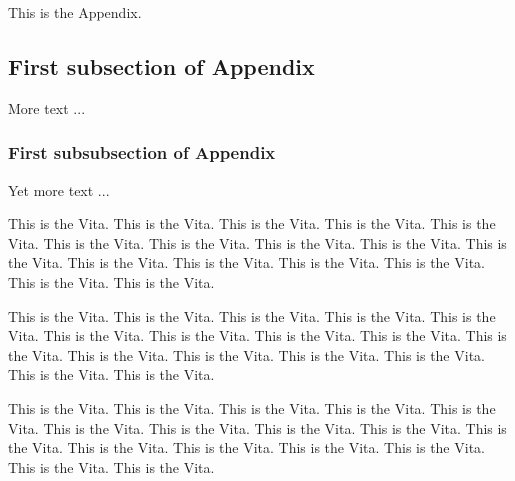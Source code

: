 \documentclass[12pt]{nuthesis}	%
\begin{document}
This is the Appendix.

\subsection{First subsection of Appendix}  %

More text ...

\subsubsection{First subsubsection of Appendix}  %

Yet more text ...


\begin{vita}                    %

This is the Vita. This is the Vita. This is the Vita. This is the Vita. 
This is the Vita. This is the Vita. This is the Vita. This is the Vita. 
This is the Vita. This is the Vita. This is the Vita. This is the Vita. 
This is the Vita. This is the Vita. This is the Vita. This is the Vita. 

This is the Vita. This is the Vita. This is the Vita. This is the Vita. 
This is the Vita. This is the Vita. This is the Vita. This is the Vita. 
This is the Vita. This is the Vita. This is the Vita. This is the Vita. 
This is the Vita. This is the Vita. This is the Vita. This is the Vita. 

This is the Vita. This is the Vita. This is the Vita. This is the Vita. 
This is the Vita. This is the Vita. This is the Vita. This is the Vita. 
This is the Vita. This is the Vita. This is the Vita. This is the Vita. 
This is the Vita. This is the Vita. This is the Vita. This is the Vita. 


\end{vita}
\end{document}
